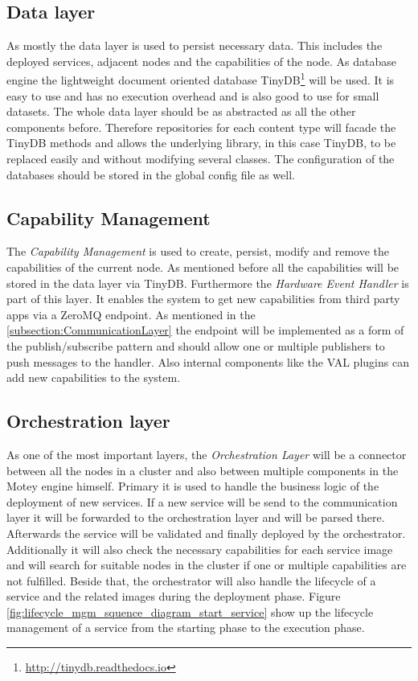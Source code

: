 \subsection{Data layer}
As mostly the data layer is used to persist necessary data.
This includes the deployed services, adjacent nodes and the capabilities of the node.
As database engine the lightweight document oriented database TinyDB\footnote{\url{http://tinydb.readthedocs.io}} will be used.
It is easy to use and has no execution overhead and is also good to use for small datasets.
The whole data layer should be as abstracted as all the other components before.
Therefore repositories for each content type will facade the TinyDB methods and allows the underlying library, in this case TinyDB, to be replaced easily and
without modifying several classes.
The configuration of the databases should be stored in the global config file as well.


\subsection{Capability Management}
The \textit{Capability Management} is used to create, persist, modify and remove the capabilities of the current node.
As mentioned before all the capabilities will be stored in the data layer via TinyDB.
Furthermore the \textit{Hardware Event Handler} is part of this layer.
It enables the system to get new capabilities from third party apps via a ZeroMQ endpoint.
As mentioned in the \ref{subsection:CommunicationLayer} the endpoint will be implemented as a form of the publish/subscribe pattern and should allow one or multiple publishers to push messages to the handler.
Also internal components like the \ac{VAL} plugins can add new capabilities to the system.


\subsection{Orchestration layer}
As one of the most important layers, the \textit{Orchestration Layer} will be a connector between all the nodes in a cluster and also between multiple components in the Motey engine himself.
Primary it is used to handle the business logic of the deployment of new services.
If a new service will be send to the communication layer it will be forwarded to the orchestration layer and will be parsed there.
Afterwards the service will be validated and finally deployed by the orchestrator.
Additionally it will also check the necessary capabilities for each service image and will search for suitable nodes in the cluster if one or multiple capabilities are not fulfilled.
Beside that, the orchestrator will also handle the lifecycle of a service and the related images during the deployment phase.
Figure \ref{fig:lifecycle_mgm_squence_diagram_start_service} show up the lifecycle management of a service from the starting phase to the execution phase.


